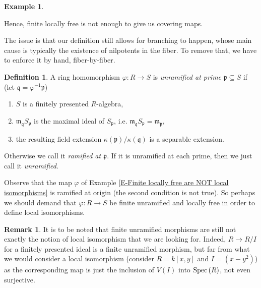 \documentclass[letterpaper,10pt,twoside]{amsart}
\newcommand{\spec}[1]{{\fontfamily{lmss}\selectfont 
		\text{\rm Spec}\left(#1\right )
}}
\newcommand{\ideal}[1]{\mathfrak{#1}}
\theoremstyle{proposition}
\theoremstyle{definition}
\newtheorem{definition}[proposition]{Definition}
\theoremstyle{theorem}
\theoremstyle{definition}
\newtheorem{remark}[proposition]{\textbf{Remark}}
\theoremstyle{definition}
\theoremstyle{definition}
\theoremstyle{lemma}
\theoremstyle{definition}
\newtheorem{example}[proposition]{\textbf{Example}}
\theoremstyle{definition}
\theoremstyle{corollary}
\theoremstyle{definition}
\begin{document}
\begin{example}
\begin{figure}[h!]
		\end{figure}
		Hence, finite locally free is not enough to give us covering maps.
	\end{example}
	The issue is that our definition still allows for branching to happen, whose main cause is typically the existence of nilpotents in the fiber. To remove that, we have to enforce it by hand, fiber-by-fiber.
	\begin{definition}
		A ring homomorphism $\varphi : R\to S$ is \textit{unramified at prime} $\ideal{p} \subseteq S$ if (let $\ideal{q} = \varphi^{-1}\ideal{p}$)
		\begin{enumerate}
			\item {$S$ is a finitely presented $R$-algebra,}
			\item {$\ideal{m}_{\ideal{q}}S_{\ideal{p}}$ is the maximal ideal of $S_{\ideal{p}}$, i.e. $\ideal{m}_{\ideal{q}}S_{\ideal{p}} = \ideal{m}_{\ideal{p}}$,}
			\item {the resulting field extension $\kappa(\ideal{p})/\kappa(\ideal{q})$ is a separable extension.}
		\end{enumerate}
		Otherwise we call it \textit{ramified at $\ideal{p}$}. If it is unramified at each prime, then we just call it \textit{unramified}.
	\end{definition}
	Observe that the map $\varphi $ of Example \ref{E-Finite locally free are NOT local isomorphisms} is ramified at origin (the second condition is not true). So perhaps we should demand that $\varphi : R\to S$ be finite unramified and locally free in order to define local isomorphisms.
	\begin{remark}
		It is to be noted that finite unramified morphisms are still not exactly the notion of local isomorphism that we are looking for. Indeed, $R\to R/I$ for a finitely presented ideal is a finite unramified morphism, but far from what we would consider a local isomorphism (consider $R = k[x,y]$ and $I = (x-y^{2})$) as the corresponding map is just the inclusion of $V(I)$ into $\spec{R}$, not even surjective. 
	\end{remark}
\end{document}
